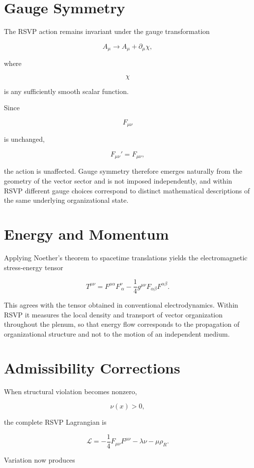 \documentclass[11pt,oneside]{book}
\numberwithin{equation}{chapter}
\theoremstyle{definition}
\theoremstyle{plain}
\begin{document}
\section{Gauge Symmetry}

The RSVP action remains invariant under the gauge transformation

\[
A_\mu
\rightarrow
A_\mu
+
\partial_\mu\chi,
\]

where

\[
\chi
\]

is any sufficiently smooth scalar function.

Since

\[
F_{\mu\nu}
\]

is unchanged,

\[
F_{\mu\nu}'
=
F_{\mu\nu},
\]

the action is unaffected. Gauge symmetry therefore emerges naturally from the geometry of the vector sector and is not imposed independently, and within RSVP different gauge choices correspond to distinct mathematical descriptions of the same underlying organizational state.

\section{Energy and Momentum}

Applying Noether's theorem to spacetime translations yields the
electromagnetic stress-energy tensor

\[
T^{\mu\nu}
=
F^{\mu\alpha}
F^\nu_{\ \alpha}
-
\frac14
g^{\mu\nu}
F_{\alpha\beta}
F^{\alpha\beta}.
\]

This agrees with the tensor obtained in conventional electrodynamics. Within RSVP it measures the local density and transport of vector organization throughout the plenum, so that energy flow corresponds to the propagation of organizational structure and not to the motion of an independent medium.

\section{Admissibility Corrections}

When structural violation becomes nonzero,

\[
\nu(x)>0,
\]

the complete RSVP Lagrangian is

\[
\mathcal L
=
-
\frac14
F_{\mu\nu}F^{\mu\nu}
-
\lambda\nu
-
\mu\rho_R.
\]

Variation now produces
\end{document}
